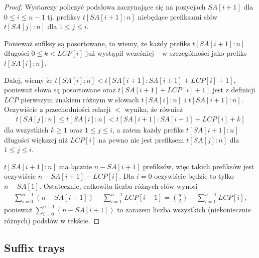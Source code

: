 \begin{proof}
  Wystarczy policzyć podsłowa zaczynające się na pozycjach $SA[i + 1]$ dla $0 \le i \le n - 1$ tj. prefiksy $t[SA[i + 1]:n]$ niebędące prefiksami słów $t[SA[j]:n]$ dla $1 \le j \le i$.
  
  Ponieważ sufiksy są posortowane, to wiemy, że każdy prefiks $t[SA[i + 1]:n]$ długości $0 \le k < LCP[i]$ już wystąpił wcześniej -- w szczególności jako prefiks $t[SA[i]:n]$.
  
  Dalej, wiemy że $t[SA[i]:n] < t[SA[i + 1]:SA[i + 1] + LCP[i] + 1]$, ponieważ słowa są posortowane oraz $t[SA[i + 1] + LCP[i] + 1]$ jest z definicji $LCP$ pierwszym znakiem różnym w słowach $t[SA[i]:n]$ i $t[SA[i + 1]:n]$. Oczywiście z przechodniości relacji $<$ wynika, że również
  \begin{align*}
    t[SA[j]:n] \le t[SA[i]:n] < t[SA[i + 1]:SA[i + 1] + LCP[i] + k]
  \end{align*}
  dla wszystkich $k \ge 1$ oraz $1 \le j \le i$, a zatem każdy prefiks $t[SA[i + 1]:n]$ długości większej niż $LCP[i]$ na pewno nie jest prefiksem $t[SA[j]:n]$ dla $1 \le j \le i$.
  
  $t[SA[i + 1]:n]$ ma łącznie $n - SA[i + 1]$ prefiksów, więc takich prefiksów jest oczywiście $n - SA[i + 1] - LCP[i]$. Dla $i = 0$ oczywiście będzie to tylko $n - SA[1]$.
  Ostatecznie, całkowita liczba różnych słów wynosi
  \begin{align*}
    \sum_{i = 0}^{n - 1} \left(n - SA[i + 1]\right) - \sum_{i = 1}^{n - 1} LCP[i - 1] = \binom{n}{2} - \sum_{i = 1}^{n - 1} LCP[i],
  \end{align*}
  ponieważ $\sum_{i = 0}^{n - 1} \left(n - SA[i + 1]\right)$ to zarazem liczba wszystkich (niekoniecznie różnych) podsłów w tekście.
\end{proof}


\subsection{Suffix trays}

